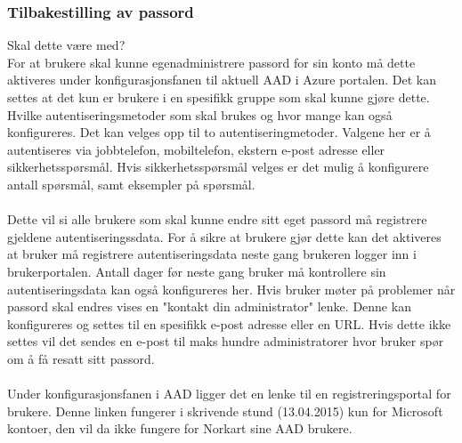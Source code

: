 \subsubsection{Tilbakestilling av passord}
\label{subsec:konfigurasjon_genrellHaandteringAvAad_tilbakestillingAvPassord}
{\color{blue} Skal dette være med?} \\
For at brukere skal kunne egenadministrere passord for sin konto må dette aktiveres under konfigurasjonsfanen til aktuell AAD i Azure portalen. Det kan settes at det kun er brukere i en spesifikk gruppe som skal kunne gjøre dette. Hvilke autentiseringsmetoder som skal brukes og hvor mange kan også konfigureres. Det kan velges opp til to autentiseringmetoder. Valgene her er å autentiseres via jobbtelefon, mobiltelefon, ekstern e-post adresse eller sikkerhetsspørsmål. Hvis sikkerhetsspørsmål velges er det mulig å konfigurere antall spørsmål, samt eksempler på spørsmål. \\
\\
Dette vil si alle brukere som skal kunne endre sitt eget passord må registrere gjeldene autentiseringssdata. For å sikre at brukere gjør dette kan det aktiveres at bruker må registrere autentiseringsdata neste gang brukeren logger inn i brukerportalen. Antall dager før neste gang bruker må kontrollere sin autentiseringsdata kan også konfigureres her. Hvis bruker møter på problemer når passord skal endres vises en "kontakt din administrator" lenke. Denne kan konfigureres og settes til en spesifikk e-post adresse eller en URL. Hvis dette ikke settes vil det sendes en e-post til maks hundre administratorer hvor bruker spør om å få resatt sitt passord.\\
\\
Under konfigurasjonsfanen i AAD ligger det en lenke til en registreringsportal for brukere. Denne linken fungerer i skrivende stund (13.04.2015) kun for Microsoft kontoer, den vil da ikke fungere for Norkart sine AAD brukere.